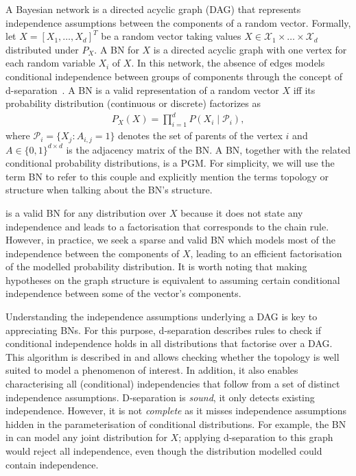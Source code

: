 A Bayesian network is a directed acyclic graph (DAG) that represents independence assumptions between the components of a random vector. Formally, let $X = \left[X_1, \hdots, X_d\right]^T$ be a random vector taking values $X \in \mathcal{X}_1 \times \dots \times \mathcal{X}_d$ distributed under $P_{X}$. A BN for $X$ is a directed acyclic graph with one vertex for each random variable $X_i$ of $X$. In this network, the absence of edges models conditional independence between groups of components through the concept of d-separation~\citep{geiger_d-separation_1990}. A BN is a valid representation of a random vector $X$ iff its probability distribution (continuous or discrete) factorizes as
\begin{align}
    P_{X}(X) = \prod^d_{i=1}P(X_i\mid \mathcal{P}_i),\label{eq:BN-fact}
\end{align}
where  $\mathcal{P}_i = \{X_j: A_{i,j} = 1 \}$ denotes the set of parents of the vertex $i$ and $A \in \{0, 1\}^{d\times d}$ is the adjacency matrix of the BN. A BN, together with the related conditional probability distributions, is a PGM. For simplicity, we will use the term BN to refer to this couple and explicitly mention the terms topology or structure when talking about the BN's structure.

 is a valid BN for any distribution over $X$ because it does not state any independence and leads to a factorisation that corresponds to the chain rule. However, in practice, we seek a sparse and valid BN which models most of the independence between the components of $X$, leading to an efficient factorisation of the modelled probability distribution. It is worth noting that making hypotheses on the graph structure is equivalent to assuming certain conditional independence between some of the vector's components.

Understanding the independence assumptions underlying a DAG is key to appreciating BNs. For this purpose, d-separation describes rules to check if conditional independence holds in all distributions that factorise over a DAG. This algorithm is described in  and allows checking whether the topology is well suited to model a phenomenon of interest. In addition, it also enables characterising all (conditional) independencies that follow from a set of distinct independence assumptions. D-separation is \textit{sound}, it only detects existing independence. However, it is not \textit{complete} as it misses independence assumptions hidden in the parameterisation of conditional distributions. For example, the BN in  can model any joint distribution for $X$; applying d-separation to this graph would reject all independence, even though the distribution modelled could contain independence.

